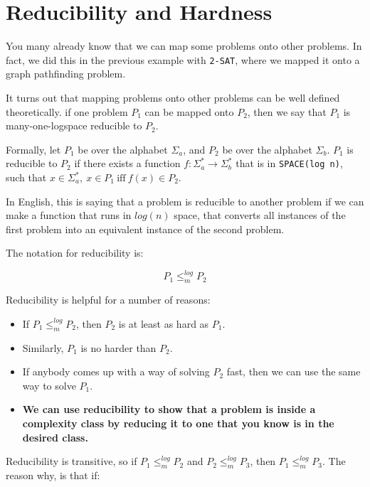 \section{Reducibility and Hardness}
\label{sec:reduce-and-hard}

You many already know that we can map some problems onto other problems. In
fact, we did this in the previous example with \texttt{2-SAT}, where we mapped
it onto a graph pathfinding problem.

It turns out that mapping problems onto other problems can be well defined
theoretically. if one problem $P_1$ can be mapped onto $P_2$, then we say that
$P_1$ is many-one-logspace reducible to $P_2$.

Formally, let $P_1$ be over the alphabet $\Sigma_a$, and $P_2$ be over the
alphabet $\Sigma_b$. $P_1$ is reducible to $P_2$ if there exists a function $f :
\Sigma^*_a \rightarrow \Sigma^*_b$ that is in \texttt{SPACE(log n)}, such that
$x \in \Sigma^*_a,~x \in P_1~\text{iff}~f(x)\in P_2$.

In English, this is saying that a problem is reducible to another problem if we
can make a function that runs in $log(n)$ space, that converts all instances of
the first problem into an equivalent instance of the second problem.

The notation for reducibility is:


\[
  P_1 \leq^{log}_m P_2
\]

Reducibility is helpful for a number of reasons:

\begin{itemize}
  \item If $P_1 \leq^{log}_m P_2$, then $P_2$ is at least as hard as $P_1$.
  \item Similarly, $P_1$ is no harder than $P_2$.
  \item If anybody comes up with a way of solving $P_2$ fast, then we can use 
    the same way to solve $P_1$.
  \item \textbf{We can use reducibility to show that a problem is inside a 
    complexity class by reducing it to one that you know is in the desired
    class.}
\end{itemize}

Reducibility is transitive, so if $P_1 \leq^{log}_m P_2$ and $P_2 \leq^{log}_m P_3$, then $P_1 \leq^{log}_m P_3$. The reason why, is that if:

